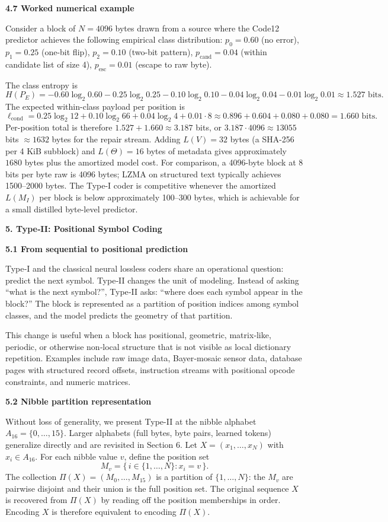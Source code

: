 \documentclass[
]{article}
\begin{document}
\textbf{4.7 Worked numerical example}

Consider a block of $N = 4096$ bytes drawn from a source where the
Code12 predictor achieves the following empirical class distribution:
$p_0 = 0.60$ (no error), $p_1 = 0.25$ (one-bit flip), $p_2 = 0.10$
(two-bit pattern), $p_{\text{cand}} = 0.04$ (within candidate list of
size 4), $p_{\text{esc}} = 0.01$ (escape to raw byte).

The class entropy is
\[
H(P_E) = -0.60 \log_2 0.60 - 0.25 \log_2 0.25 - 0.10 \log_2 0.10
- 0.04 \log_2 0.04 - 0.01 \log_2 0.01 \approx 1.527 \text{ bits.}
\]
The expected within-class payload per position is
\[
\ell_{\text{cond}} = 0.25 \log_2 12 + 0.10 \log_2 66 + 0.04 \log_2 4
+ 0.01 \cdot 8 \approx 0.896 + 0.604 + 0.080 + 0.080 = 1.660 \text{ bits.}
\]
Per-position total is therefore $1.527 + 1.660 \approx 3.187$ bits,
or $3.187 \cdot 4096 \approx 13055$ bits $\approx 1632$ bytes for
the repair stream. Adding $L(V) = 32$ bytes (a SHA-256 per 4 KiB
subblock) and $L(\Theta) = 16$ bytes of metadata gives approximately
$1680$ bytes plus the amortized model cost. For comparison, a 4096-byte block at 8 bits per byte raw
is 4096 bytes; LZMA on structured text typically achieves 1500--2000
bytes. The Type-I coder is competitive whenever the amortized $L(M_I)$
per block is below approximately 100--300 bytes, which is achievable
for a small distilled byte-level predictor.

\textbf{5. Type‑II: Positional Symbol Coding}

\textbf{5.1 From sequential to positional prediction}

Type‑I and the classical neural lossless coders share an operational
question: predict the next symbol. Type‑II changes the unit of modeling.
Instead of asking ``what is the next symbol?'', Type‑II asks: ``where
does each symbol appear in the block?'' The block is represented as a
partition of position indices among symbol classes, and the model
predicts the geometry of that partition.

This change is useful when a block has positional, geometric,
matrix‑like, periodic, or otherwise non‑local structure that is not
visible as local dictionary repetition. Examples include raw image data,
Bayer‑mosaic sensor data, database pages with structured record offsets,
instruction streams with positional opcode constraints, and numeric
matrices.

\textbf{5.2 Nibble partition representation}

Without loss of generality, we present Type-II at the nibble alphabet
$A_{16} = \{0, \ldots, 15\}$. Larger alphabets (full bytes, byte pairs,
learned tokens) generalize directly and are revisited in Section 6.
Let $X = (x_1, \ldots, x_N)$ with $x_i \in A_{16}$. For each nibble
value $v$, define the position set
\[
M_v = \{\, i \in \{1, \ldots, N\} : x_i = v \,\}.
\]
The collection $\Pi(X) = (M_0, \ldots, M_{15})$ is a partition of
$\{1, \ldots, N\}$: the $M_v$ are pairwise disjoint and their union is
the full position set. The original sequence $X$ is recovered from
$\Pi(X)$ by reading off the position memberships in order. Encoding
$X$ is therefore equivalent to encoding $\Pi(X)$.
\end{document}
